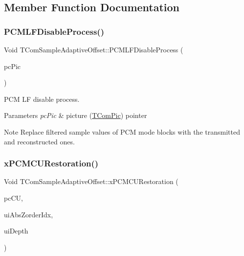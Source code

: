 \subsection{Member Function Documentation}
\mbox{\label{class_t_com_sample_adaptive_offset_a29e664fe0b361ebc41344885fd0bf1c5}} 
\subsubsection{\texorpdfstring{P\+C\+M\+L\+F\+Disable\+Process()}{PCMLFDisableProcess()}}
{\footnotesize\ttfamily Void T\+Com\+Sample\+Adaptive\+Offset\+::\+P\+C\+M\+L\+F\+Disable\+Process (\begin{DoxyParamCaption}\item[{\hyperlink{class_t_com_pic}{T\+Com\+Pic} $\ast$}]{pc\+Pic }\end{DoxyParamCaption})}

P\+CM LF disable process. 
\begin{DoxyParams}{Parameters}
{\em pc\+Pic} & picture (\hyperlink{class_t_com_pic}{T\+Com\+Pic}) pointer\\
\hline
\end{DoxyParams}
\begin{DoxyNote}{Note}
Replace filtered sample values of P\+CM mode blocks with the transmitted and reconstructed ones. 
\end{DoxyNote}
\mbox{\label{class_t_com_sample_adaptive_offset_a64607aac63f53c0c2a8ef083a7cb97a4}} 
\subsubsection{\texorpdfstring{x\+P\+C\+M\+C\+U\+Restoration()}{xPCMCURestoration()}}
{\footnotesize\ttfamily Void T\+Com\+Sample\+Adaptive\+Offset\+::x\+P\+C\+M\+C\+U\+Restoration (\begin{DoxyParamCaption}\item[{\hyperlink{class_t_com_data_c_u}{T\+Com\+Data\+CU} $\ast$}]{pc\+CU,  }\item[{U\+Int}]{ui\+Abs\+Zorder\+Idx,  }\item[{U\+Int}]{ui\+Depth }\end{DoxyParamCaption})\hspace{0.3cm}{\ttfamily [protected]}}

